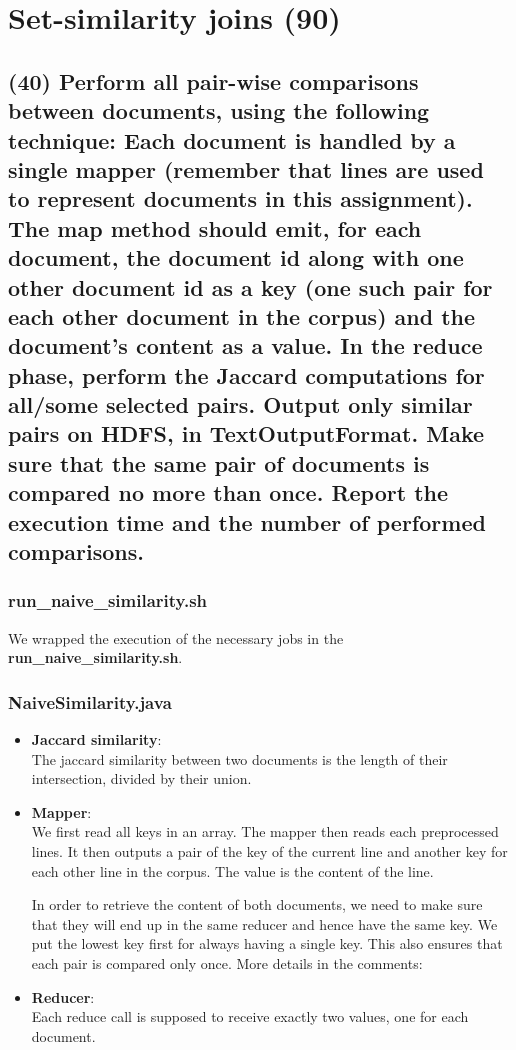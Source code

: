 \documentclass[a4paper,10pt]{article}
\begin{document}
\section{Set-similarity joins (90)}
\subsection{(40) Perform all pair-wise comparisons between documents, using the following
technique: Each document is handled by a single mapper (remember that lines are
used to represent documents in this assignment). The map method should emit, for
each document, the document id along with one other document id as a key (one such
pair for each other document in the corpus) and the document’s content as a value.
In the reduce phase, perform the Jaccard computations for all/some selected pairs.
Output only similar pairs on HDFS, in TextOutputFormat.
Make sure that the same pair of documents is compared no more than once. Report
the execution time and the number of performed comparisons.}
\subsubsection{run\_naive\_similarity.sh}
We wrapped the execution of the necessary jobs in the \textbf{run\_naive\_similarity.sh}.


\subsubsection{NaiveSimilarity.java}
\begin{itemize}
  \item \textbf{Jaccard similarity}:\\
  The jaccard similarity between two documents is the length of their intersection,
  divided by their union.
  

  \item \textbf{Mapper}:\\
  We first read all keys in an array.
  The mapper then reads each preprocessed lines. It then outputs a pair of the
  key of the current line and another key for each other line in the corpus.
  The value is the content of the line.

  In order to retrieve the content of both documents, we need to make sure that
  they will end up in the same reducer and hence have the same key.
  We put the lowest key first for always having a single key.
  This also ensures that each pair is compared only once.
  More details in the comments:
  

  \item \textbf{Reducer}:\\
  Each reduce call is supposed to receive exactly two values, one for each document.
  
\end{itemize}
\end{document}
